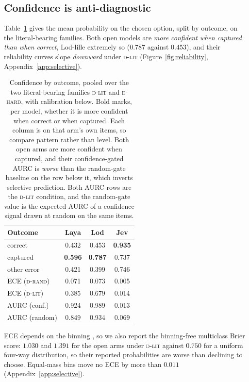 \documentclass[11pt]{article}
\newcommand{\Drand}{\textsc{d-rand}}
\newcommand{\Dlit}{\textsc{d-lit}}
\newcommand{\Dhard}{\textsc{d-hard}}
\begin{document}
\subsection{Confidence is anti-diagnostic}
\label{sec:confidence}

Table~\ref{tab:conf} gives the mean probability on the chosen option, split by
outcome, on the literal-bearing families. Both open models are \emph{more
confident when captured than when correct}, Lod-lille extremely so ($0.787$
against $0.453$), and their reliability curves slope \emph{downward} under \Dlit{}
(Figure~\ref{fig:reliability}, Appendix~\ref{app:selective}).

\begin{table}[t]
\centering\small
\setlength{\tabcolsep}{4pt}
\begin{tabular}{lccc}
\toprule
\textbf{Outcome} & \textbf{Laya} & \textbf{Lod} & \textbf{Jev} \\
\midrule
correct          & 0.432 & 0.453 & \textbf{0.935} \\
captured         & \textbf{0.596} & \textbf{0.787} & 0.737 \\
other error      & 0.421 & 0.399 & 0.746 \\
\midrule
ECE (\Drand)     & 0.071 & 0.073 & 0.005 \\
ECE (\Dlit)      & 0.385 & 0.679 & 0.014 \\
AURC (conf.)     & 0.924 & 0.989 & 0.013 \\
AURC (random)    & 0.849 & 0.934 & 0.069 \\
\bottomrule
\end{tabular}
\caption{Confidence by outcome, pooled over the two literal-bearing families
\Dlit{} and \Dhard, with calibration below.
Bold marks, per model, whether it is more confident when correct or when captured.
Each column is on that arm's own items, so compare pattern rather than level.
Both open arms are more confident when captured, and their confidence-gated AURC
is \emph{worse} than the random-gate baseline on the row below it, which inverts
selective prediction. Both AURC rows are the \Dlit{} condition, and the random-gate
value is the expected AURC of a confidence signal drawn at random on the same
items.}
\label{tab:conf}
\end{table}

ECE depends on the binning \citep{nixon2019measuring}, so we also report the
binning-free multiclass Brier score: $1.030$ and $1.391$ for the open arms under
\Dlit{} against $0.750$ for a uniform four-way distribution, so their reported
probabilities are worse than declining to choose. Equal-mass bins move no ECE by
more than $0.011$ (Appendix~\ref{app:selective}).
\end{document}
